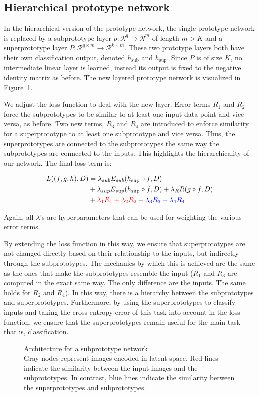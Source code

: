 \subsection{Hierarchical prototype network}
In the hierarchical version of the prototype network, the single prototype network is replaced by a subprototype layer $p : \mathcal{R}^q\rightarrow \mathcal{R}^m$ of length $m > K$ and a superprototype layer $P:\mathcal{R}^{q\times m}\rightarrow\mathcal{R}^{k\times m}$. These two prototype layers both have their own classification output, denoted $h_{\text{sub}}$ and $h_{\text{sup}}$. Since $P$ is of size $K$, no intermediate linear layer is learned, instead its output is fixed to the negative identity matrix as before. The new layered prototype network is visualized in Figure~\ref{fig:hierarchical}. 


We adjust the loss function to deal with the new layer. Error terms $R_1$ and $R_2$ force the subprototypes to be similar to at least one input data point and vice versa, as before. Two new terms, $R_3$ and $R_4$ are introduced to enforce similarity for a superprototype to at least one subprototype and vice versa. Thus, the superprototypes are connected to the subprototypes the same way the subprototypes are connected to the inputs. This highlights the hierarchicality of our network. The final loss term is:

\begin{align*}
    L((f,g,h),D) &= \lambda_{sub} E_{sub}(h_{\text{sup}} \circ f, D)\\ &+ \lambda_{sup} E_{sup}(h_{\text{sup}} \circ f, D) 
    + \lambda_R R(g \circ f,D)\\ &+ {\color{red}\lambda_1 R_1 + \lambda_2 R_2}  + {\color{blue}\lambda_3 R_3 + \lambda_4 R_4}
\end{align*}

Again, all $\lambda$'s are hyperparameters that can be used for weighting the various error terms.

By extending the loss function in this way, we ensure that superprototypes are not changed directly based on their relationship to the inputs, but indirectly through the subprototypes. The mechanics by which this is achieved are the same as the ones that make the subprototypes resemble the input ($R_1$ and $R_3$ are computed in the exact same way. The only difference are the inputs. The same holds for $R_2$ and $R_4$). In this way, there is a hierarchy between the subprototypes and superprototypes. Furthermore, by using the superprototypes to classify inputs and taking the cross-entropy error of this task into account in the loss function, we ensure that the superprototypes remain useful for the main task -- that is, classification. 

\begin{figure}[hb]
    \centering
    
    \caption{Architecture for a subprototype network\\ {\normalfont Gray nodes represent images encoded in latent space. {\color{red} Red} lines indicate the similarity between the input images and the subprototypes. In contrast, {\color{blue} blue} lines indicate the similarity between the superprototypes and subprototypes.}}
    \label{fig:hierarchical}
\end{figure}
